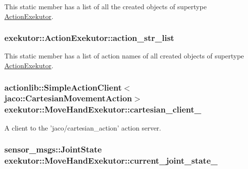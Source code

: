\-This static member has a list of all the created objects of supertype \hyperlink{classexekutor_1_1ActionExekutor}{\-Action\-Exekutor}. 

\hypertarget{classexekutor_1_1ActionExekutor_a0dc39a7a2a3a67d2bdd366f9e6e682a2}{
\subsubsection[{action\-\_\-str\-\_\-list}]{ {\bf exekutor\-::\-Action\-Exekutor\-::action\-\_\-str\-\_\-list}}}\label{classexekutor_1_1ActionExekutor_a0dc39a7a2a3a67d2bdd366f9e6e682a2}


\-This static member has a list of action names of all created objects of supertype \hyperlink{classexekutor_1_1ActionExekutor}{\-Action\-Exekutor}. 

\hypertarget{classexekutor_1_1MoveHandExekutor_a781e5e4ed50e4d78df1cf8be07e0742e}{
\subsubsection[{cartesian\-\_\-client\-\_\-}]{\setlength{\rightskip}{0pt plus 5cm}actionlib\-::\-Simple\-Action\-Client$<$jaco\-::\-Cartesian\-Movement\-Action$>$ {\bf exekutor\-::\-Move\-Hand\-Exekutor\-::cartesian\-\_\-client\-\_\-}}}\label{classexekutor_1_1MoveHandExekutor_a781e5e4ed50e4d78df1cf8be07e0742e}


\-A client to the 'jaco/cartesian\-\_\-action' action server. 

\hypertarget{classexekutor_1_1MoveHandExekutor_a7334c666e871a0002fc78819f9ca3de9}{
\subsubsection[{current\-\_\-joint\-\_\-state\-\_\-}]{\setlength{\rightskip}{0pt plus 5cm}sensor\-\_\-msgs\-::\-Joint\-State {\bf exekutor\-::\-Move\-Hand\-Exekutor\-::current\-\_\-joint\-\_\-state\-\_\-}}}\label{classexekutor_1_1MoveHandExekutor_a7334c666e871a0002fc78819f9ca3de9}


